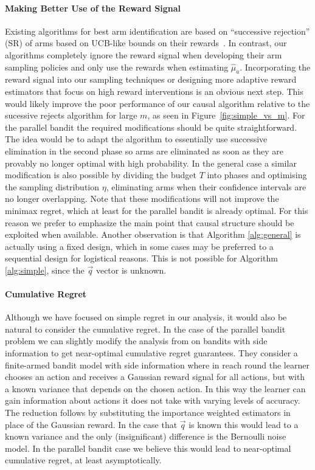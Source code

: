 \documentclass{article}
\theoremstyle{plain}
\theoremstyle{definition}
\begin{document}
\paragraph{Making Better Use of the Reward Signal}
Existing algorithms for best arm identification are based on ``successive rejection'' (SR) of arms based on UCB-like bounds on their rewards~\citep{Even-Dar2002}.
In contrast, our algorithms completely ignore the reward signal when developing their arm sampling policies and only use the rewards when estimating $\hat{\mu}_a$.
Incorporating the reward signal into our sampling techniques or designing more adaptive reward estimators that focus on high reward interventions is an obvious next step.
This would likely improve the poor performance of our causal algorithm relative to the sucessive rejects algorithm for large $m$, as seen in Figure~\ref{fig:simple_vs_m}.
For the parallel bandit the required modifications should be quite straightforward. The idea would be to adapt the algorithm to essentially use successive elimination in
the second phase so arms are eliminated as soon as they are provably no longer optimal with high probability. In the general case a similar modification is also possible
by dividing the budget $T$ into phases and optimising the sampling distribution $\eta$, eliminating arms when their confidence intervals are no longer overlapping. Note
that these modifications will not improve the minimax regret, which at least for the parallel bandit is already optimal. For this reason we prefer to emphasize 
the main point that causal structure should be exploited when available. Another observation is that Algorithm \ref{alg:general} is actually using a fixed design, which
in some cases may be preferred to a sequential design for logistical reasons. This is not possible for Algorithm \ref{alg:simple}, since the $\vec{q}$ vector is unknown.

\vspace{-0.4cm} 
\paragraph{Cumulative Regret}
Although we have focused on simple regret in our analysis, it would also be natural to consider the cumulative regret.
In the case of the parallel bandit problem we can slightly modify the analysis from \citep{wu2015online} on bandits with side information 
to get near-optimal cumulative regret guarantees. They consider a finite-armed bandit model with side information where in reach round
the learner chooses an action and receives a Gaussian reward signal for all actions, but with a known variance that depends on the chosen action.
In this way the learner can gain information about actions it does not take with varying levels of accuracy. The reduction follows by substituting
the importance weighted estimators in place of the Gaussian reward. In the case that $\vec{q}$ is known this would lead to a known variance
and the only (insignificant) difference is the Bernoulli noise model. In the parallel bandit case we believe this would lead to near-optimal cumulative regret,
at least asymptotically. 
\end{document}
